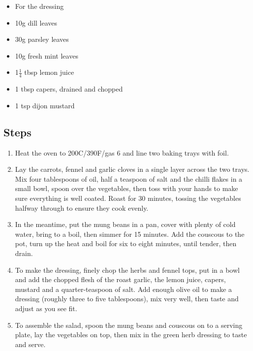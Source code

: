 \documentclass{book}
\begin{document}
\begin{itemize}
\item For the dressing
\item 10g dill leaves
\item 30g parsley leaves
\item 10g fresh mint leaves
\item 1$\frac{1}{4}$ tbsp lemon juice
\item 1 tbsp capers, drained and chopped
\item 1 tsp dijon mustard
\end{itemize}

\subsection*{Steps}
\begin{enumerate}
\item Heat the oven to 200C/390F/gas 6 and line two baking trays with foil.
\item Lay the carrots, fennel and garlic cloves in a single layer across the two trays. Mix four tablespoons of oil, half a teaspoon of salt and the chilli flakes in a small bowl, spoon over the vegetables, then toss with your hands to make sure everything is well coated. Roast for 30 minutes, tossing the vegetables halfway through to ensure they cook evenly.
\item In the meantime, put the mung beans in a pan, cover with plenty of cold water, bring to a boil, then simmer for 15 minutes. Add the couscous to the pot, turn up the heat and boil for six to eight minutes, until tender, then drain.
\item To make the dressing, finely chop the herbs and fennel tops, put in a bowl and add the chopped flesh of the roast garlic, the lemon juice, capers, mustard and a quarter-teaspoon of salt. Add enough olive oil to make a dressing (roughly three to five tablespoons), mix very well, then taste and adjust as you see fit.
\item To assemble the salad, spoon the mung beans and couscous on to a serving plate, lay the vegetables on top, then mix in the green herb dressing to taste and serve.
\end{enumerate}
\newpage
\end{document}
